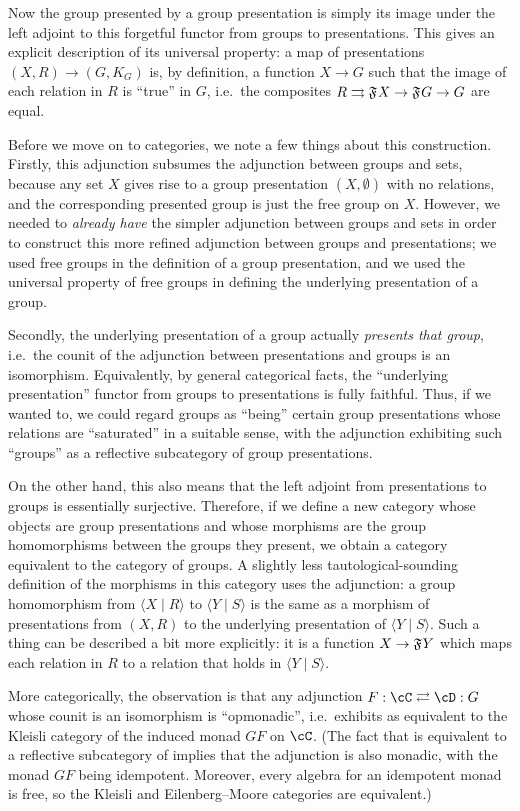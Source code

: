 Now the group presented by a group presentation is simply its image under the left adjoint to this forgetful functor from groups to presentations.
This gives an explicit description of its universal property: a map of presentations $(X,R) \to (G,K_G)$ is, by definition, a function $X\to G$ such that the image of each relation in $R$ is ``true'' in $G$, i.e.\ the composites $R \rightrightarrows \mathfrak{F}_{}X \to \mathfrak{F}_{}G \to G$ are equal.

Before we move on to categories, we note a few things about this construction.
Firstly, this adjunction subsumes the adjunction between groups and sets, because any set $X$ gives rise to a group presentation $(X,\emptyset)$ with no relations, and the corresponding presented group is just the free group on $X$.
However, we needed to \emph{already have} the simpler adjunction between groups and sets in order to construct this more refined adjunction between groups and presentations; we used free groups in the definition of a group presentation, and we used the universal property of free groups in defining the underlying presentation of a group.

Secondly, the underlying presentation of a group actually \emph{presents that group}, i.e.\ the counit of the adjunction between presentations and groups is an isomorphism.
Equivalently, by general categorical facts, the ``underlying presentation'' functor from groups to presentations is fully faithful.
Thus, if we wanted to, we could regard groups as ``being'' certain group presentations whose relations are ``saturated'' in a suitable sense, with the adjunction exhibiting such ``groups'' as a reflective subcategory of group presentations.

On the other hand, this also means that the left adjoint from presentations to groups is essentially surjective.
Therefore, if we define a new category whose objects are group presentations and whose morphisms are the group homomorphisms between the groups they present, we obtain a category equivalent to the category of groups.
A slightly less tautological-sounding definition of the morphisms in this category uses the adjunction: a group homomorphism from $\langle X\mid R\rangle$ to $\langle Y\mid S\rangle$ is the same as a morphism of presentations from $(X,R)$ to the underlying presentation of $\langle Y\mid S\rangle$.
Such a thing can be described a bit more explicitly: it is a function $X\to \mathfrak{F}_{}Y$ which maps each relation in $R$ to a relation that holds in $\langle Y\mid S\rangle$.

More categorically, the observation is that any adjunction $F:\cC \toot \cD : G$ whose counit is an isomorphism is ``opmonadic'', i.e.\ exhibits \cD as equivalent to the Kleisli category of the induced monad $G F$ on $\cC$.
(The fact that \cD is equivalent to a reflective subcategory of \cC implies that the adjunction is also monadic, with the monad $G F$ being idempotent.
Moreover, every algebra for an idempotent monad is free, so the Kleisli and Eilenberg--Moore categories are equivalent.)

